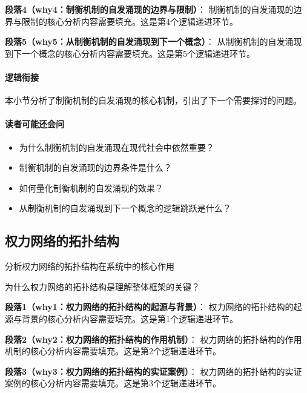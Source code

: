 \documentclass[../main.tex]{subfiles}
\begin{document}
{{\textbf{段落4（why4：制衡机制的自发涌现的边界与限制）}：
制衡机制的自发涌现的边界与限制的核心分析内容需要填充。这是第4个逻辑递进环节。


\textbf{段落5（why5：从制衡机制的自发涌现到下一个概念）}：
从制衡机制的自发涌现到下一个概念的核心分析内容需要填充。这是第5个逻辑递进环节。


\paragraph*{逻辑衔接}
本小节分析了制衡机制的自发涌现的核心机制，引出了下一个需要探讨的问题。

\paragraph*{读者可能还会问}
\begin{itemize}
\item 为什么制衡机制的自发涌现在现代社会中依然重要？
\item 制衡机制的自发涌现的边界条件是什么？
\item 如何量化制衡机制的自发涌现的效果？
\item 从制衡机制的自发涌现到下一个概念的逻辑跳跃是什么？
\end{itemize}


\subsection{权力网络的拓扑结构}

\begin{motivation}
分析权力网络的拓扑结构在系统中的核心作用
\end{motivation}

\begin{logicmap}
[逻辑链占位]
\end{logicmap}

\begin{questionbox}
为什么权力网络的拓扑结构是理解整体框架的关键？
\end{questionbox}

\textbf{段落1（why1：权力网络的拓扑结构的起源与背景）}：
权力网络的拓扑结构的起源与背景的核心分析内容需要填充。这是第1个逻辑递进环节。


\textbf{段落2（why2：权力网络的拓扑结构的作用机制）}：
权力网络的拓扑结构的作用机制的核心分析内容需要填充。这是第2个逻辑递进环节。


\textbf{段落3（why3：权力网络的拓扑结构的实证案例）}：
权力网络的拓扑结构的实证案例的核心分析内容需要填充。这是第3个逻辑递进环节。


}}
\end{document}
